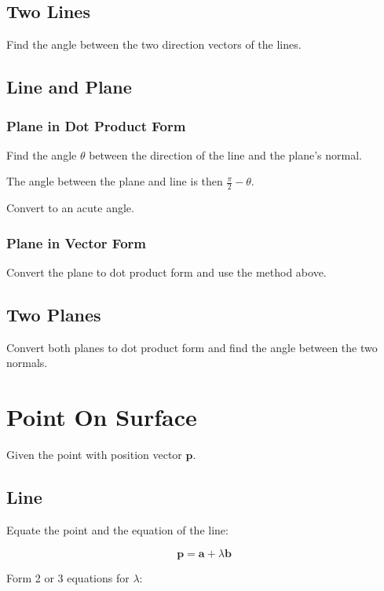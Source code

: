 \documentclass[a4paper,11pt]{article}
\newcommand{\bb}{\boldsymbol}
\begin{document}
\subsection{Two Lines}

Find the angle between the two direction vectors of the lines.


\subsection{Line and Plane}

\subsubsection{Plane in Dot Product Form}

Find the angle $\theta$ between the direction of the line and the plane's normal.

The angle between the plane and line is then $\frac{\pi}{2} - \theta$.

Convert to an acute angle.


\subsubsection{Plane in Vector Form}

Convert the plane to dot product form and use the method above.


\subsection{Two Planes}

Convert both planes to dot product form and find the angle between the two
normals.



\section{Point On Surface}

Given the point with position vector $\bb{p}$.


\subsection{Line}

Equate the point and the equation of the line:

$$
\bb{p} = \bb{a} + \lambda \bb{b}
$$

Form 2 or 3 equations for $\lambda$:
\end{document}
